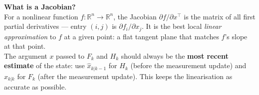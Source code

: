 \documentclass[12pt, a4paper]{article}
\begin{document}
\begin{notebox}
  \textbf{What is a Jacobian?}\\
  For a nonlinear function $f: \mathbb{R}^n \to \mathbb{R}^n$, the
  Jacobian $\partial f / \partial x^\top$ is the matrix of all first
  partial derivatives --- entry $(i,j)$ is $\partial f_i / \partial x_j$.
  It is the best local \emph{linear approximation} to $f$ at a given
  point: a flat tangent plane that matches $f$'s slope at that point.\\[4pt]
  The argument $x$ passed to $F_k$ and $H_k$ should always be the
  \textbf{most recent estimate} of the state:
  use $\hat{x}_{k|k-1}$ for $H_k$ (before the measurement update)
  and $\hat{x}_{k|k}$ for $F_k$ (after the measurement update).
  This keeps the linearisation as accurate as possible.
\end{notebox}
\end{document}
